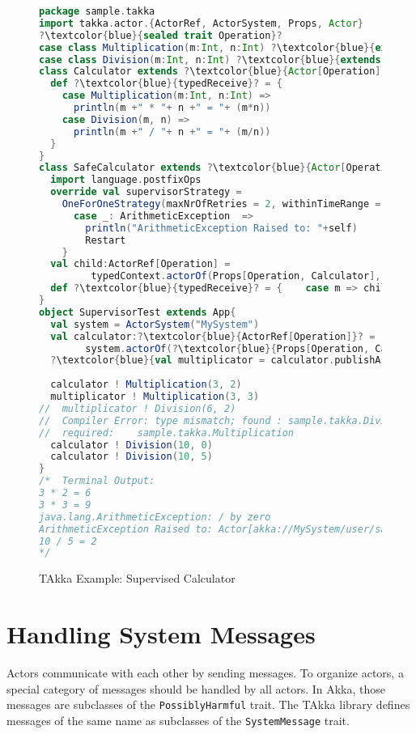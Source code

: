 \begin{figure}[p]
    \begin{lstlisting}[language=scala, escapechar=?]
package sample.takka
import takka.actor.{ActorRef, ActorSystem, Props, Actor}
?\textcolor{blue}{sealed trait Operation}?
case class Multiplication(m:Int, n:Int) ?\textcolor{blue}{extends Operation}?
case class Division(m:Int, n:Int) ?\textcolor{blue}{extends Operation}?
class Calculator extends ?\textcolor{blue}{Actor[Operation]}? {
  def ?\textcolor{blue}{typedReceive}? = {
    case Multiplication(m:Int, n:Int) =>
      println(m +" * "+ n +" = "+ (m*n))    
    case Division(m, n) =>
      println(m +" / "+ n +" = "+ (m/n))
  }
}
class SafeCalculator extends ?\textcolor{blue}{Actor[Operation]}? {
  import language.postfixOps
  override val supervisorStrategy =
    OneForOneStrategy(maxNrOfRetries = 2, withinTimeRange = 1 minute) {
      case _: ArithmeticException  =>
        println("ArithmeticException Raised to: "+self)
        Restart
    }
  val child:ActorRef[Operation] = 
         typedContext.actorOf(Props[Operation, Calculator], "child")
  def ?\textcolor{blue}{typedReceive}? = {    case m => child ! m  }
}
object SupervisorTest extends App{
  val system = ActorSystem("MySystem")
  val calculator:?\textcolor{blue}{ActorRef[Operation]}? = 
        system.actorOf(?\textcolor{blue}{Props[Operation, Calculator]}?, "calculator")
  ?\textcolor{blue}{val multiplicator = calculator.publishAs[Multiplication]}?
  
  calculator ! Multiplication(3, 2)
  multiplicator ! Multiplication(3, 3)
//  multiplicator ! Division(6, 2)  
//  Compiler Error: type mismatch; found : sample.takka.Division 
//  required: 	 sample.takka.Multiplication
  calculator ! Division(10, 0)
  calculator ! Division(10, 5)
}  
/*  Terminal Output:
3 * 2 = 6
3 * 3 = 9
java.lang.ArithmeticException: / by zero
ArithmeticException Raised to: Actor[akka://MySystem/user/safecalculator]
10 / 5 = 2
*/
    \end{lstlisting}
    \caption{TAkka Example: Supervised Calculator}
    \label{takka_safe_calculator}
\end{figure}

\newpage

\section{Handling System Messages}
\label{systemmessage}

Actors communicate with each other by sending messages.  To organize actors, a 
special category of messages should be handled by all actors.  In Akka, those 
messages are subclasses of the {\tt PossiblyHarmful} trait.  The TAkka library 
defines messages of the same name as subclasses of the {\tt SystemMessage} trait.


